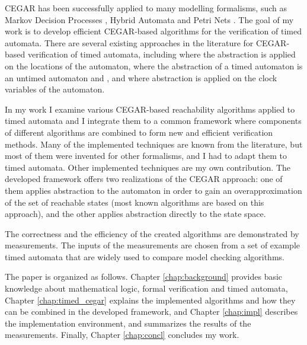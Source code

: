 CEGAR \cite{clarke2003counterexample} has been successfully applied to many modelling formalisms, such as Markov Decision Processes \cite{kwiatkowska2006game}, Hybrid Automata \cite{journals/fmsd/PrabhakarDM015} and Petri Nets \cite{journals/actaC/HajduVBM14}. The goal of my work is to develop efficient CEGAR-based algorithms for the verification of timed automata. There are several existing approaches in the literature for CEGAR-based verification of timed automata, including \cite{kemper2007sat} where the abstraction is applied on the locations of the automaton, \cite{nagaoka2010abstraction} where the abstraction of a timed automaton is an untimed
automaton and \cite{dierks2007automatic, he2010compositional}, and \cite{okano2011clock} where abstraction is applied on the clock variables of the automaton.

In my work I examine various CEGAR-based reachability algorithms applied to timed automata and I integrate them to a common framework where components of different algorithms are combined to form new and efficient verification methods. Many of the implemented techniques are known from the literature, but most of them were invented for other formalisms, and I had to adapt them to timed automata. Other implemented techniques are my own contribution. The developed framework offers two realizations of the CEGAR approach: one of them applies abstraction to the automaton in order to gain an overapproximation of the set of reachable states (most known algorithms are based on this approach), and the other applies abstraction directly to the state space. 

The correctness and the efficiency %
of the created algorithms are demonstrated by measurements. The inputs of the measurements are chosen from a set of example timed automata that are widely used to compare model checking algorithms.

The paper is organized as follows. Chapter \ref{chap:background} provides basic knowledge about mathematical logic, formal verification and timed automata, Chapter \ref{chap:timed_cegar} explains the implemented algorithms and how they can be combined in the developed framework, and Chapter \ref{chap:impl} describes the implementation environment, and summarizes the results of the measurements. Finally, Chapter \ref{chap:concl} concludes my work.

 


